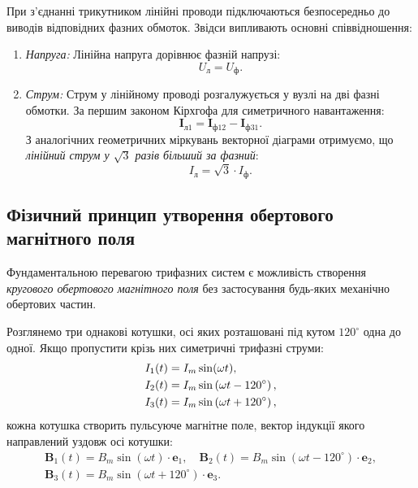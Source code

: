При з'єднанні трикутником лінійні проводи підключаються безпосередньо до виводів відповідних фазних обмоток. Звідси випливають основні співвідношення:
\begin{enumerate}
	\item \emph{Напруга:} Лінійна напруга дорівнює фазній напрузі:
	\begin{equation}
		U_\text{л} = U_\text{ф}.
	\end{equation}
	\item \emph{Струм:} Струм у лінійному проводі розгалужується у вузлі на дві фазні обмотки. За першим законом Кірхгофа для симетричного навантаження:
	\begin{equation}
		\mathbf{I}_{\text{л}1} = \mathbf{I}_{\text{ф}12} - \mathbf{I}_{\text{ф}31}.
	\end{equation}
	З аналогічних геометричних міркувань векторної діаграми отримуємо, що \emph{лінійний струм у $\sqrt{3}$ разів більший за фазний}:
	\begin{equation}
		I_\text{л} = \sqrt{3} \cdot I_\text{ф}.
	\end{equation}
\end{enumerate}

\subsection*{Фізичний принцип утворення обертового магнітного поля}

Фундаментальною перевагою трифазних систем є можливість створення \emph{кругового обертового магнітного поля} без застосування будь-яких механічно обертових частин.

Розглянемо три однакові котушки, осі яких розташовані під кутом $120^\circ$ одна до одної. Якщо пропустити крізь них симетричні трифазні струми:
\begin{align}
	I_1(t) &= I_m \sin(\omega t), \notag \\
	I_2(t) &= I_m \sin\left(\omega t - 120^\circ\right), \\
	I_3(t) &= I_m \sin\left(\omega t + 120^\circ\right), \notag
\end{align}
кожна котушка створить пульсуюче магнітне поле, вектор індукції якого направлений уздовж осі котушки:
\begin{multline}
	\mathbf{B}_1(t) = B_m \sin(\omega t) \cdot \mathbf{e}_1, \quad \mathbf{B}_2(t) = B_m \sin(\omega t - 120^\circ) \cdot \mathbf{e}_2, \\ \mathbf{B}_3(t) = B_m \sin(\omega t + 120^\circ) \cdot \mathbf{e}_3.
\end{multline}

